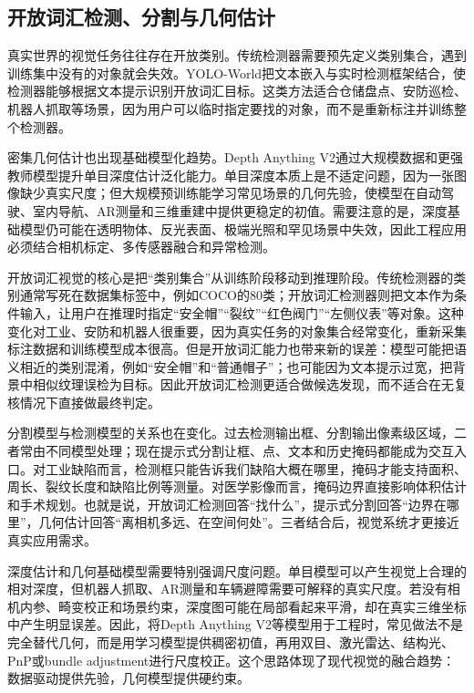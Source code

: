 \documentclass[UTF8,a4paper,12pt]{ctexart}
\newcommand{\model}[1]{\textsf{#1}}
\begin{document}
\subsection{开放词汇检测、分割与几何估计}
真实世界的视觉任务往往存在开放类别。传统检测器需要预先定义类别集合，遇到训练集中没有的对象就会失效。\model{YOLO-World}把文本嵌入与实时检测框架结合，使检测器能够根据文本提示识别开放词汇目标\cite{yoloworld}。这类方法适合仓储盘点、安防巡检、机器人抓取等场景，因为用户可以临时指定要找的对象，而不是重新标注并训练整个检测器。

密集几何估计也出现基础模型化趋势。\model{Depth Anything V2}通过大规模数据和更强教师模型提升单目深度估计泛化能力\cite{depthanythingv2}。单目深度本质上是不适定问题，因为一张图像缺少真实尺度；但大规模预训练能学习常见场景的几何先验，使模型在自动驾驶、室内导航、AR测量和三维重建中提供更稳定的初值。需要注意的是，深度基础模型仍可能在透明物体、反光表面、极端光照和罕见场景中失效，因此工程应用必须结合相机标定、多传感器融合和异常检测。

开放词汇视觉的核心是把“类别集合”从训练阶段移动到推理阶段。传统检测器的类别通常写死在数据集标签中，例如COCO的80类；开放词汇检测器则把文本作为条件输入，让用户在推理时指定“安全帽”“裂纹”“红色阀门”“左侧仪表”等对象。这种变化对工业、安防和机器人很重要，因为真实任务的对象集合经常变化，重新采集标注数据和训练模型成本很高。但是开放词汇能力也带来新的误差：模型可能把语义相近的类别混淆，例如“安全帽”和“普通帽子”；也可能因为文本提示过宽，把背景中相似纹理误检为目标。因此开放词汇检测更适合做候选发现，而不适合在无复核情况下直接做最终判定。

分割模型与检测模型的关系也在变化。过去检测输出框、分割输出像素级区域，二者常由不同模型处理；现在提示式分割让框、点、文本和历史掩码都能成为交互入口。对工业缺陷而言，检测框只能告诉我们缺陷大概在哪里，掩码才能支持面积、周长、裂纹长度和缺陷比例等测量。对医学影像而言，掩码边界直接影响体积估计和手术规划。也就是说，开放词汇检测回答“找什么”，提示式分割回答“边界在哪里”，几何估计回答“离相机多远、在空间何处”。三者结合后，视觉系统才更接近真实应用需求。

深度估计和几何基础模型需要特别强调尺度问题。单目模型可以产生视觉上合理的相对深度，但机器人抓取、AR测量和车辆避障需要可解释的真实尺度。若没有相机内参、畸变校正和场景约束，深度图可能在局部看起来平滑，却在真实三维坐标中产生明显误差。因此，将\model{Depth Anything V2}等模型用于工程时，常见做法不是完全替代几何，而是用学习模型提供稠密初值，再用双目、激光雷达、结构光、PnP或bundle adjustment进行尺度校正。这个思路体现了现代视觉的融合趋势：数据驱动提供先验，几何模型提供硬约束。
\end{document}
